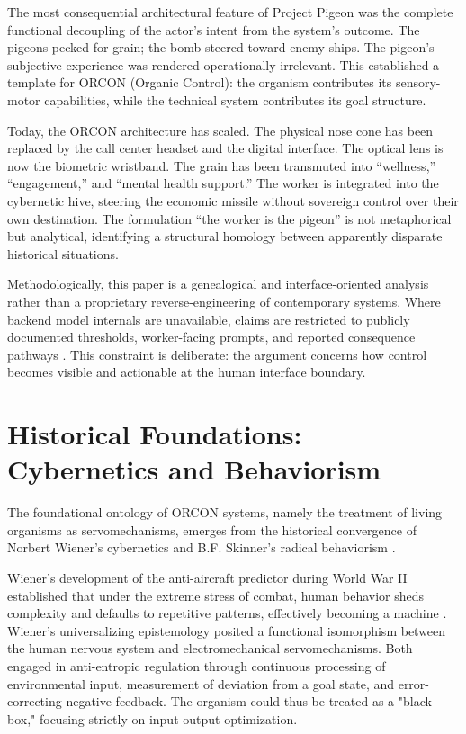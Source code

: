 \documentclass[11pt, a4paper]{article}
\begin{document}
The most consequential architectural feature of Project Pigeon was the complete functional decoupling of the actor's intent from the system's outcome. The pigeons pecked for grain; the bomb steered toward enemy ships. The pigeon's subjective experience was rendered operationally irrelevant. This established a template for ORCON (Organic Control): the organism contributes its sensory-motor capabilities, while the technical system contributes its goal structure.

Today, the ORCON architecture has scaled. The physical nose cone has been replaced by the call center headset and the digital interface. The optical lens is now the biometric wristband. The grain has been transmuted into ``wellness,'' ``engagement,'' and ``mental health support.'' The worker is integrated into the cybernetic hive, steering the economic missile without sovereign control over their own destination. The formulation ``the worker is the pigeon'' is not metaphorical but analytical, identifying a structural homology between apparently disparate historical situations.

Methodologically, this paper is a genealogical and interface-oriented analysis rather than a proprietary reverse-engineering of contemporary systems. Where backend model internals are unavailable, claims are restricted to publicly documented thresholds, worker-facing prompts, and reported consequence pathways \cite{kellogg2020algorithms,gurley2022vice,delagarza2019time}. This constraint is deliberate: the argument concerns how control becomes visible and actionable at the human interface boundary.

\section{Historical Foundations: Cybernetics and Behaviorism}

The foundational ontology of ORCON systems, namely the treatment of living organisms as servomechanisms, emerges from the historical convergence of Norbert Wiener's cybernetics and B.F. Skinner's radical behaviorism \cite{wiener1948cybernetics,skinner1953science}.

Wiener's development of the anti-aircraft predictor during World War II established that under the extreme stress of combat, human behavior sheds complexity and defaults to repetitive patterns, effectively becoming a machine \cite{wiener1948cybernetics}. Wiener's universalizing epistemology posited a functional isomorphism between the human nervous system and electromechanical servomechanisms. Both engaged in anti-entropic regulation through continuous processing of environmental input, measurement of deviation from a goal state, and error-correcting negative feedback. The organism could thus be treated as a "black box," focusing strictly on input-output optimization.
\end{document}
